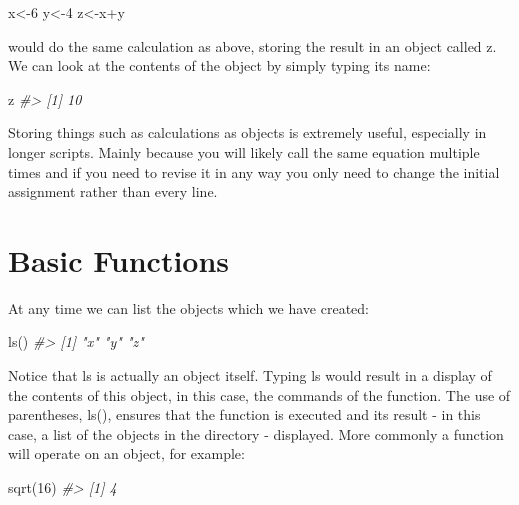 \documentclass[
]{book}
\newenvironment{Shaded}{\begin{snugshade}}{\end{snugshade}}
\newcommand{\CommentTok}[1]{\textcolor[rgb]{0.56,0.35,0.01}{\textit{#1}}}
\newcommand{\DecValTok}[1]{\textcolor[rgb]{0.00,0.00,0.81}{#1}}
\newcommand{\FunctionTok}[1]{\textcolor[rgb]{0.00,0.00,0.00}{#1}}
\newcommand{\NormalTok}[1]{#1}
\newcommand{\OtherTok}[1]{\textcolor[rgb]{0.56,0.35,0.01}{#1}}
\newcommand{\SpecialCharTok}[1]{\textcolor[rgb]{0.00,0.00,0.00}{#1}}
\begin{document}
\begin{Shaded}
\begin{Highlighting}[]
\NormalTok{x}\OtherTok{\textless{}{-}}\DecValTok{6}
\NormalTok{y}\OtherTok{\textless{}{-}}\DecValTok{4}
\NormalTok{z}\OtherTok{\textless{}{-}}\NormalTok{x}\SpecialCharTok{+}\NormalTok{y}
\end{Highlighting}
\end{Shaded}

would do the same calculation as above, storing the result in an object called z. We can look at
the contents of the object by simply typing its name:

\begin{Shaded}
\begin{Highlighting}[]
\NormalTok{z}
\CommentTok{\#\textgreater{} [1] 10}
\end{Highlighting}
\end{Shaded}

Storing things such as calculations as objects is extremely useful, especially in longer scripts. Mainly because you will likely call the same equation multiple times and if you need to revise it in any way you only need to change the initial assignment rather than every line.

\hypertarget{basic-functions}{%
\section{Basic Functions}\label{basic-functions}}

At any time we can list the objects which we have created:

\begin{Shaded}
\begin{Highlighting}[]
\FunctionTok{ls}\NormalTok{()}
\CommentTok{\#\textgreater{} [1] "x" "y" "z"}
\end{Highlighting}
\end{Shaded}

Notice that ls is actually an object itself. Typing ls would result in a display of the contents of
this object, in this case, the commands of the function. The use of parentheses, ls(), ensures that
the function is executed and its result - in this case, a list of the objects in the directory - displayed.
More commonly a function will operate on an object, for example:

\begin{Shaded}
\begin{Highlighting}[]
\FunctionTok{sqrt}\NormalTok{(}\DecValTok{16}\NormalTok{)}
\CommentTok{\#\textgreater{} [1] 4}
\end{Highlighting}
\end{Shaded}
\end{document}
